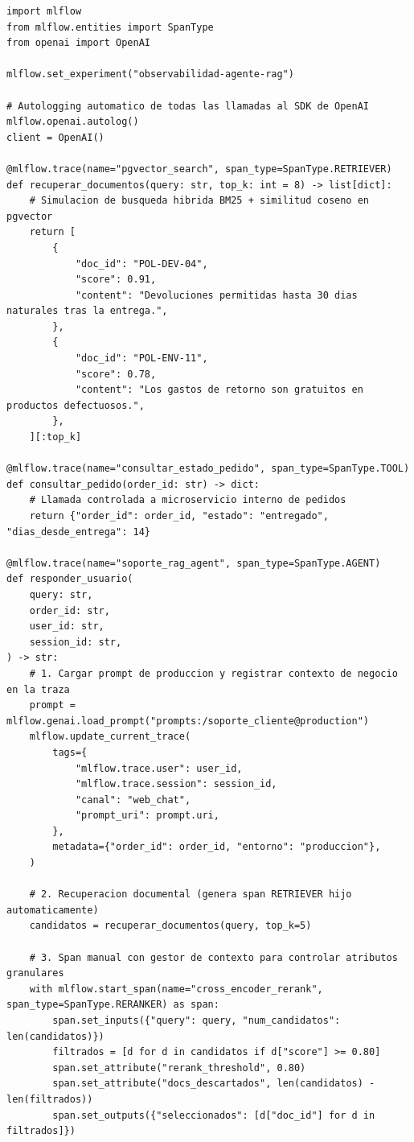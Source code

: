\begin{lstlisting}[style=python, caption={Instrumentación híbrida en MLflow Tracing: autologging de OpenAI, decorador \code{@mlflow.trace}, gestor de contexto \code{start\_span} y enriquecimiento de metadatos de sesión.}, label={lst:mlflow-tracing-manual}]
import mlflow
from mlflow.entities import SpanType
from openai import OpenAI

mlflow.set_experiment("observabilidad-agente-rag")

# Autologging automatico de todas las llamadas al SDK de OpenAI
mlflow.openai.autolog()
client = OpenAI()

@mlflow.trace(name="pgvector_search", span_type=SpanType.RETRIEVER)
def recuperar_documentos(query: str, top_k: int = 8) -> list[dict]:
    # Simulacion de busqueda hibrida BM25 + similitud coseno en pgvector
    return [
        {
            "doc_id": "POL-DEV-04",
            "score": 0.91,
            "content": "Devoluciones permitidas hasta 30 dias naturales tras la entrega.",
        },
        {
            "doc_id": "POL-ENV-11",
            "score": 0.78,
            "content": "Los gastos de retorno son gratuitos en productos defectuosos.",
        },
    ][:top_k]

@mlflow.trace(name="consultar_estado_pedido", span_type=SpanType.TOOL)
def consultar_pedido(order_id: str) -> dict:
    # Llamada controlada a microservicio interno de pedidos
    return {"order_id": order_id, "estado": "entregado", "dias_desde_entrega": 14}

@mlflow.trace(name="soporte_rag_agent", span_type=SpanType.AGENT)
def responder_usuario(
    query: str,
    order_id: str,
    user_id: str,
    session_id: str,
) -> str:
    # 1. Cargar prompt de produccion y registrar contexto de negocio en la traza
    prompt = mlflow.genai.load_prompt("prompts:/soporte_cliente@production")
    mlflow.update_current_trace(
        tags={
            "mlflow.trace.user": user_id,
            "mlflow.trace.session": session_id,
            "canal": "web_chat",
            "prompt_uri": prompt.uri,
        },
        metadata={"order_id": order_id, "entorno": "produccion"},
    )

    # 2. Recuperacion documental (genera span RETRIEVER hijo automaticamente)
    candidatos = recuperar_documentos(query, top_k=5)

    # 3. Span manual con gestor de contexto para controlar atributos granulares
    with mlflow.start_span(name="cross_encoder_rerank", span_type=SpanType.RERANKER) as span:
        span.set_inputs({"query": query, "num_candidatos": len(candidatos)})
        filtrados = [d for d in candidatos if d["score"] >= 0.80]
        span.set_attribute("rerank_threshold", 0.80)
        span.set_attribute("docs_descartados", len(candidatos) - len(filtrados))
        span.set_outputs({"seleccionados": [d["doc_id"] for d in filtrados]})


\end{lstlisting}
